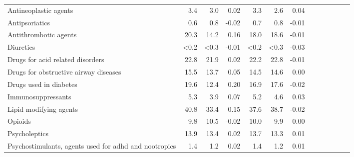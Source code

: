 \documentclass[11pt,]{article}
\begin{document}
\begin{longtable}{lrrrrrrrrrrrr}
      Antineoplastic agents &  3.4 &  3.0 &  0.02 &  3.3 &  2.6 &  0.04 \\ 
      Antipsoriatics &  0.6 &  0.8 & -0.02 &  0.7 &  0.8 & -0.01 \\ 
      Antithrombotic agents & 20.3 & 14.2 &  0.16 & 18.0 & 18.6 & -0.01 \\ 
      Diuretics & <0.2 & <0.3 & -0.01 & <0.2 & <0.3 & -0.03 \\ 
      Drugs for acid related disorders & 22.8 & 21.9 &  0.02 & 22.2 & 22.8 & -0.01 \\ 
      Drugs for obstructive airway diseases & 15.5 & 13.7 &  0.05 & 14.5 & 14.6 &  0.00 \\ 
      Drugs used in diabetes & 19.6 & 12.4 &  0.20 & 16.9 & 17.6 & -0.02 \\ 
      Immunosuppressants &  5.3 &  3.9 &  0.07 &  5.2 &  4.6 &  0.03 \\ 
      Lipid modifying agents & 40.8 & 33.4 &  0.15 & 37.6 & 38.7 & -0.02 \\ 
      Opioids &  9.8 & 10.5 & -0.02 & 10.0 &  9.9 &  0.00 \\ 
      Psycholeptics & 13.9 & 13.4 &  0.02 & 13.7 & 13.3 &  0.01 \\ 
      Psychostimulants, agents used for adhd and nootropics &  1.4 &  1.2 &  0.02 &  1.4 &  1.2 &  0.01 \\ 
   \bottomrule\end{longtable}
\clearpage
{}
\end{document}
